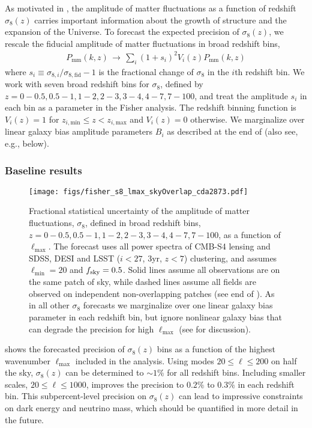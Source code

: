 \documentclass[prd,superscriptaddress,floatfix,notitlepage,nofootinbib,reprint]{revtex4-1} %
\begin{document}
As motivated in , the amplitude of matter fluctuations as a function of redshift $\sigma_8(z)$ carries important information about the growth of structure and the expansion of the Universe.
To forecast the expected precision of $\sigma_8(z)$, we rescale the fiducial amplitude of matter fluctuations in broad redshift bins,
\begin{align}
  \label{eq:sigma8Rescaling}
  P_\mathrm{mm}(k,z) \,\rightarrow \, \sum_i (1+s_i)^2 V_i(z) P_\mathrm{mm}(k,z)
\end{align}
where $s_i\equiv \sigma_{8,i}/\sigma_{8,\mathrm{fid}}-1$ is the fractional change of $\sigma_8$ in the $i$th redshift bin.
We work with seven broad redshift bins for $\sigma_8$, defined by $z=0-0.5,0.5-1,1-2,2-3,3-4,4-7,7-100$, and treat the amplitude $s_i$ in each bin as a parameter in the Fisher analysis.
The redshift binning function is $V_i(z)=1$ for $z_{i,\mathrm{min}}\le z< z_{i,\mathrm{max}}$ and $V_i(z)=0$ otherwise.
We marginalize over linear galaxy bias amplitude parameters $B_i$ as described at the end of  (also see, e.g.,  below).



\subsubsection{Baseline results}

\begin{figure}[tbp]
\texttt{[image: figs/fisher\_s8\_lmax\_skyOverlap\_cda2873.pdf]}
\caption{Fractional statistical uncertainty of the amplitude of matter fluctuations, $\sigma_8$, defined in broad redshift bins, $z=0-0.5,0.5-1,1-2,2-3,3-4,4-7,7-100$, as a function of $\ell_\mathrm{max}$. The forecast uses all power spectra of  CMB-S4 lensing and SDSS, DESI and LSST ($i<27$, 3yr, $z<7$) clustering, and assumes $\ell_\mathrm{min}=20$ and ${f_\mathrm{sky}}=0.5$.
Solid lines assume all observations are on the same patch of sky, while dashed lines assume  all fields are observed on independent non-overlapping patches (see end of ).
As in all other $\sigma_8$ forecasts we marginalize over one linear galaxy bias parameter in each redshift bin, but ignore nonlinear galaxy bias that can degrade the precision for high $\ell_\mathrm{max}$ (see  for discussion).
}
\label{fig:s8_lmax_skyoverlap}
\end{figure}



 shows the forecasted precision of $\sigma_8(z)$ bins as a function of the highest wavenumber $\ell_\mathrm{max}$ included in the analysis.
Using modes $20\le \ell\le 200$ on half the sky, $\sigma_8(z)$ can be determined to $\sim 1\%$ for all redshift bins. 
Including smaller scales, $20\le\ell\le 1000$, improves the precision to $0.2\%$ to $0.3\%$ in each redshift bin.
This subpercent-level precision on $\sigma_8(z)$ can lead to impressive constraints on dark energy and neutrino mass, which should be quantified in more detail in the future.
\end{document}
